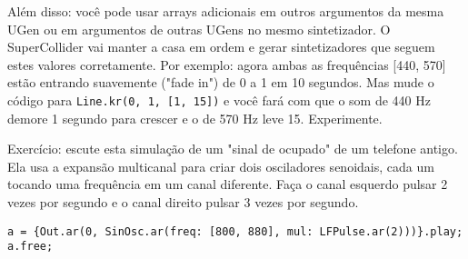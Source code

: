 Além disso: você pode usar arrays adicionais em outros argumentos da mesma UGen ou em argumentos de outras UGens no mesmo sintetizador. O SuperCollider vai manter a casa em ordem e gerar sintetizadores que seguem estes valores corretamente. Por exemplo: agora ambas as frequências [440, 570] estão entrando suavemente ("fade in") de 0 a 1 em 10 segundos. Mas mude o código para \texttt{Line.kr(0, 1, [1, 15])} e você fará com que o som de 440 Hz demore 1 segundo para crescer e o de 570 Hz leve 15. Experimente.

Exercício: escute esta simulação de um "sinal de ocupado" de um telefone antigo. Ela usa a expansão multicanal para criar dois osciladores senoidais, cada um tocando uma frequência em um canal diferente. Faça o canal esquerdo pulsar 2 vezes por segundo e o canal direito pulsar 3 vezes por segundo. 

\medskip
\begin{lstlisting}[style=SuperCollider-IDE, basicstyle=\scttfamily\footnotesize]
a = {Out.ar(0, SinOsc.ar(freq: [800, 880], mul: LFPulse.ar(2)))}.play;
a.free;
\end{lstlisting}
